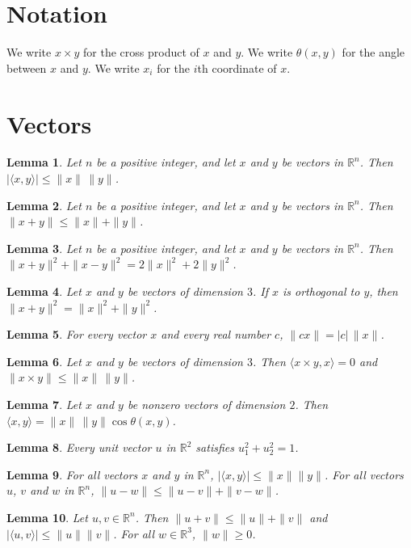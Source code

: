 \documentclass{article}
\newtheorem{lemma}{Lemma}
\begin{document}
\section{Notation}

We write $x\times y$ for the cross product of $x$ and $y$.
We write $\theta(x,y)$ for the angle between $x$ and $y$.
We write $x_i$ for the $i$th coordinate of $x$.

\section{Vectors}

\begin{lemma}\label{cauchy}
Let $n$ be a positive integer, and let $x$ and $y$ be vectors in $\mathbb{R}^n$. Then $|\langle x,y\rangle|\le\|x\|\,\|y\|$.
\end{lemma}

\begin{lemma}\label{triangle}
Let $n$ be a positive integer, and let $x$ and $y$ be vectors in $\mathbb{R}^n$. Then $\|x+y\|\le\|x\|+\|y\|$.
\end{lemma}

\begin{lemma}\label{parallelogram}
Let $n$ be a positive integer, and let $x$ and $y$ be vectors in $\mathbb{R}^n$. Then $\|x+y\|^2+\|x-y\|^2=2\|x\|^2+2\|y\|^2$.
\end{lemma}

\begin{lemma}\label{pythagoras}
Let $x$ and $y$ be vectors of dimension $3$. If $x$ is orthogonal to $y$, then $\|x+y\|^2=\|x\|^2+\|y\|^2$.
\end{lemma}

\begin{lemma}\label{scalar}
For every vector $x$ and every real number $c$, $\|cx\|=|c|\,\|x\|$.
\end{lemma}

\begin{lemma}\label{cross}
Let $x$ and $y$ be vectors of dimension $3$. Then $\langle x\times y,x\rangle=0$ and $\|x\times y\|\le\|x\|\,\|y\|$.
\end{lemma}

\begin{lemma}\label{angle}
Let $x$ and $y$ be nonzero vectors of dimension $2$. Then $\langle x,y\rangle=\|x\|\,\|y\|\cos\theta(x,y)$.
\end{lemma}

\begin{lemma}\label{unit}
Every unit vector $u$ in $\mathbb{R}^2$ satisfies $u_1^2+u_2^2=1$.
\end{lemma}

\begin{lemma}\label{names-in-space}
For all vectors $x$ and $y$ in $\mathbb{R}^n$, $|\langle x,y\rangle|\le\|x\|\|y\|$. For all vectors $u$, $v$ and $w$ in $\mathbb{R}^n$, $\|u-w\|\le\|u-v\|+\|v-w\|$.
\end{lemma}

\begin{lemma}\label{vectors-in-Rn}
Let $u,v\in\mathbb{R}^n$. Then $\|u+v\|\le\|u\|+\|v\|$ and $|\langle u,v\rangle|\le\|u\|\|v\|$. For all $w\in\mathbb{R}^3$, $\|w\|\ge0$.
\end{lemma}
\end{document}
